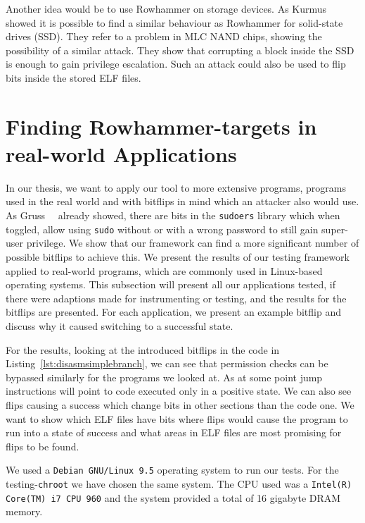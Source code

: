 Another idea would be to use Rowhammer on storage devices. As
Kurmus~\etal~\cite{rowssdhammer} showed it is possible to find a similar
behaviour as Rowhammer for solid-state drives (SSD). They refer to a problem in
MLC NAND chips, showing the possibility of a similar attack. They show that
corrupting a block inside the SSD is enough to gain privilege escalation. Such
an attack could also be used to flip bits inside the stored ELF files.


\chapter{Finding Rowhammer-targets in real-world
Applications}\label{sec:results}

In our thesis, we want to apply our tool to more extensive programs, programs
used in the real world and with bitflips in mind which an attacker also would
use. As Gruss~\etal~\cite{flipinthewall} already showed, there are bits in the
\texttt{sudoers} library which when toggled, allow using \texttt{sudo} without
or with a wrong password to still gain super-user privilege. We show that our
framework can find a more significant number of possible bitflips to achieve
this. We present the results of our testing framework applied to real-world
programs, which are commonly used in Linux-based operating systems. This
subsection will present all our applications tested, if there were adaptions
made for instrumenting or testing, and the results for the bitflips are
presented. For each application, we present an example bitflip and discuss why
it caused switching to a successful state.

For the results, looking at the introduced bitflips in the code in
Listing~\ref{lst:disasmsimplebranch}, we can see that permission checks can be
bypassed similarly for the programs we looked at. As at some point jump
instructions will point to code executed only in a positive state. We can also
see flips causing a success which change bits in other sections than the code
one. We want to show which ELF files have bits where flips would cause the
program to run into a state of success and what areas in ELF files are most
promising for flips to be found.

We used a \texttt{Debian GNU/Linux 9.5} operating system to run our tests. For
the testing-\texttt{chroot} we have chosen the same system. The CPU used was a
\texttt{Intel(R) Core(TM) i7 CPU 960} and the system provided a total of 16
gigabyte DRAM memory.

